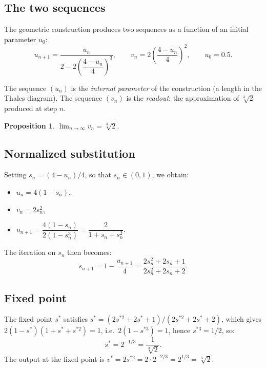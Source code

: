 \documentclass[11pt,a4paper]{article}
\theoremstyle{definition}
\newtheorem{proposition}{Proposition}[section]
\newcommand{\cbrt}[1]{\sqrt[3]{#1}}
\begin{document}
\subsection{The two sequences}

The geometric construction produces two sequences as a function of an initial parameter $u_0$:
\begin{equation}
  \label{eq:pandrosion_orig}
  u_{n+1} = \frac{u_n}{2 - 2\!\left(\dfrac{4 - u_n}{4}\right)^{\!3}},
  \qquad
  v_n = 2\!\left(\frac{4 - u_n}{4}\right)^{\!2},
  \qquad u_0 = 0.5.
\end{equation}

The sequence $(u_n)$ is the \emph{internal parameter} of the construction (a length in the Thales diagram). The sequence $(v_n)$ is the \emph{readout}: the approximation of $\cbrt{2}$ produced at step $n$.

\begin{proposition}
$\displaystyle\lim_{n\to\infty} v_n = \cbrt{2}$.
\end{proposition}

\subsection{Normalized substitution}

Setting $s_n = (4 - u_n)/4$, so that $s_n \in (0,1)$, we obtain:
\begin{itemize}
  \item $u_n = 4(1 - s_n)$,
  \item $v_n = 2s_n^2$,
  \item $u_{n+1} = \dfrac{4(1-s_n)}{2(1-s_n^3)} = \dfrac{2}{1 + s_n + s_n^2}$.
\end{itemize}

The iteration on $s_n$ then becomes:
\begin{equation}
  \label{eq:iter_s3}
  s_{n+1} = 1 - \frac{u_{n+1}}{4} = \frac{2s_n^2 + 2s_n + 1}{2s_n^2 + 2s_n + 2}.
\end{equation}

\subsection{Fixed point}

The fixed point $s^*$ satisfies $s^* = (2s^{*2} + 2s^* + 1)/(2s^{*2} + 2s^* + 2)$, which gives $2(1-s^*)(1+s^*+s^{*2}) = 1$, i.e.\ $2(1-s^{*3}) = 1$, hence $s^{*3} = 1/2$, so:
\[
  s^* = 2^{-1/3} = \frac{1}{\cbrt{2}}.
\]
The output at the fixed point is $v^* = 2s^{*2} = 2 \cdot 2^{-2/3} = 2^{1/3} = \cbrt{2}$. \checkmark
\end{document}
